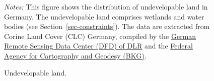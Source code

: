 \documentclass[
  12pt,
]{article}
\begin{document}
\begin{figure}


\caption{\label{fig-undevelopable-land}Undevelopable
land.}
\begin{minipage}{0.975\textwidth}
\small
\emph{Notes:} This figure shows the
distribution of undevelopable land in Germany. The undevelopable land
comprises wetlands and water bodies (see Section~\ref{sec-constraints}).
The data are extracted from Corine Land Cover (CLC) Germany, compiled by
the
\href{https://www.dlr.de/eoc/en/desktopdefault.aspx/tabid-11882/20871_read-48836}{German
Remote Sensing Data Center (DFD) of DLR} and the
\href{https://www.bkg.bund.de}{Federal Agency for Cartography and
Geodesy (BKG)}.
\end{minipage}


\end{figure}%
\end{document}
